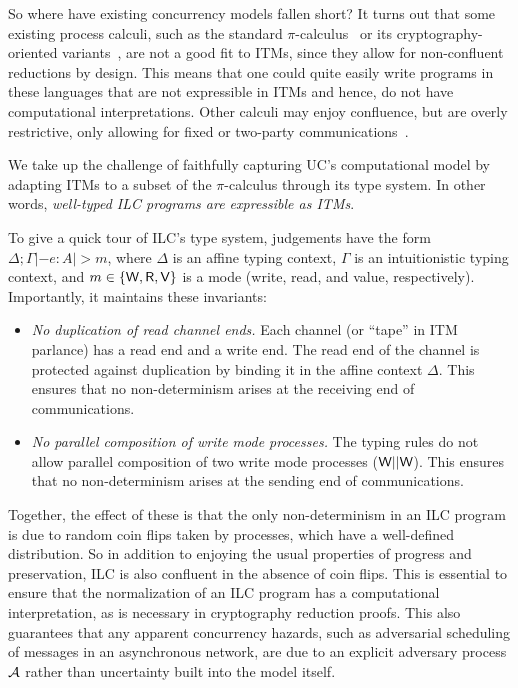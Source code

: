 So where have existing concurrency models fallen short?  It turns out that some
existing process calculi, such as the standard
$\pi$-calculus~\cite{milner1999communicating} or its cryptography-oriented
variants~\cite{abadi1999calculus, abadi2001mobile}, are not a good fit to ITMs,
since they allow for non-confluent reductions by design. This means that one
could quite easily write programs in these languages that are not expressible in
ITMs and hence, do not have computational interpretations. Other calculi may
enjoy confluence, but are overly restrictive, only allowing for fixed or
two-party
communications~\cite{kobayashi1999linearity,bohl2016symbolic,fowler2018session}. 

We take up the challenge of faithfully capturing UC's computational model by
adapting ITMs to a subset of the $\pi$-calculus through its type system. In other
words, \emph{well-typed ILC programs are expressible as ITMs}.

To give a quick tour of ILC's type system, judgements have the form $\Delta ; \Gamma |- e
: A |> m$, where $\Delta$ is an affine typing context, $\Gamma$ is an intuitionistic typing
context, and $m \in \{\textsf{W}, \textsf{R}, \textsf{V}\}$ is a mode (write, read, and value,
respectively). Importantly, it maintains these invariants:

\begin{itemize}[leftmargin=*]
\item \emph{No duplication of read channel ends.} Each channel (or ``tape'' in
  ITM parlance) has a read end and a write end. The read end of the channel is
  protected against duplication by binding it in the affine context $\Delta$. This
  ensures that no non-determinism arises at the receiving end of communications.

\item \emph{No parallel composition of write mode processes.} The typing rules
  do not allow parallel composition of two write mode processes ($\textsf{W} ||
  \textsf{W}$). This ensures that no non-determinism arises at the sending end of
  communications.
\end{itemize}

Together, the effect of these is that the only non-determinism in an ILC program
is due to random coin flips taken by processes, which have a well-defined
distribution. So in addition to enjoying the usual properties of progress and
preservation, ILC is also confluent in the absence of coin flips. This is
essential to ensure that the normalization of an ILC program has a computational
interpretation, as is necessary in cryptography reduction proofs. 
This also guarantees that any apparent concurrency hazards, such as adversarial
scheduling of messages in an asynchronous network, are due to an explicit
adversary process $\mathcal{{A}}$ rather than uncertainty built into the model itself.

